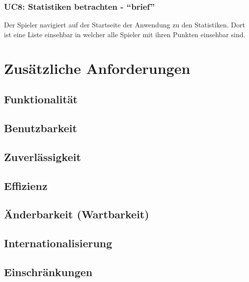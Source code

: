 \documentclass[11pt,ngerman]{article}
\newcommand{\quotes}[1]{``#1''}
\begin{document}
             \subsubsection{UC8: Statistiken betrachten - \quotes{brief}}
             \label{sssec:UC8Statistikenbetrachten}
                \begin{tcolorbox}[enhanced, breakable, sharp corners, width=\dimexpr\textwidth-15mm\relax ,enlarge left by=10mm ,fontupper=\linespread{1.1}\selectfont, boxrule=1pt, title={UC8: Statistiken betrachten}, colback=white, colframe=gray!22, coltitle=black]
                    Der Spieler navigiert auf der Startseite der Anwendung zu den Statistiken. Dort ist eine Liste einsehbar in welcher alle Spieler mit ihren Punkten einsehbar sind.
                \end{tcolorbox}

    \section{Zusätzliche Anforderungen}

    \subsection{Funktionalität}

    \subsection{Benutzbarkeit}

    \subsection{Zuverlässigkeit}

    \subsection{Effizienz}

    \subsection{Änderbarkeit (Wartbarkeit)}

    \subsection{Internationalisierung}

    \subsection{Einschränkungen}
\end{document}

